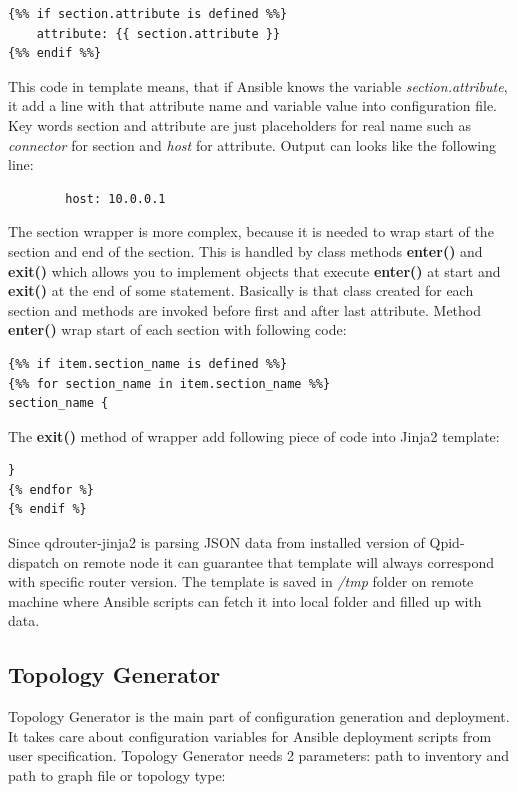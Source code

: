\begin{verbatim}
{%% if section.attribute is defined %%}
    attribute: {{ section.attribute }}
{%% endif %%}
\end{verbatim}

This code in template means, that if Ansible knows the variable \emph{section.attribute}, it add a line with that attribute name and variable value into configuration file. Key words section and attribute are just placeholders for real name such as \emph{connector} for section and \emph{host} for attribute. Output can looks like the following line:

\begin{verbatim}
		host: 10.0.0.1
\end{verbatim}

The section wrapper is more complex, because it is needed to wrap start of the section and end of the section. This is handled by class methods \textbf{\textunderscore enter\textunderscore ()} and \textbf{\textunderscore exit\textunderscore ()} which allows you to implement objects that execute \textbf{\textunderscore enter\textunderscore ()} at start and \textbf{\textunderscore exit\textunderscore ()} at the end of some statement. Basically is that class created for each section and methods are invoked before first and after last attribute. Method \textbf{\textunderscore enter\textunderscore ()} wrap start of each section with following code:

\begin{verbatim}
{%% if item.section_name is defined %%}
{%% for section_name in item.section_name %%}
section_name {
\end{verbatim}

The \textbf{\textunderscore exit\textunderscore ()} method of wrapper add following piece of code into Jinja2 template:
\begin{verbatim}
}
{% endfor %}
{% endif %}
\end{verbatim}

Since qdrouter-jinja2 is parsing JSON data from installed version of Qpid-dispatch on remote node it can guarantee that template will always correspond with specific router version. The template is saved in \emph{/tmp} folder on remote machine where Ansible scripts can fetch it into local folder and filled up with data.

\subsection{Topology Generator}
Topology Generator is the main part of configuration generation and deployment. It takes care about configuration variables for Ansible deployment scripts from user specification. Topology Generator needs 2 parameters: path to inventory and path to graph file or topology type:

